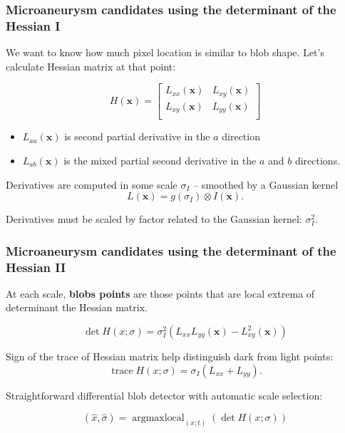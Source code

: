\begin{frame}\frametitle{Microaneurysm candidates using the determinant of the Hessian I}

We want to know how much pixel location is similar to blob shape. Let's calculate Hessian matrix at that point:

\[
H(\mathbf{x}) = 
\begin{bmatrix}
L_{xx}(\mathbf{x}) & L_{xy}(\mathbf{x})\\
L_{xy}(\mathbf{x}) & L_{yy}(\mathbf{x})\\
\end{bmatrix}
\]

\begin{itemize}
\item $L_{aa}(\mathbf{x})$ is second partial derivative in the $a$ direction 
\item $L_{ab}(\mathbf{x})$ is the mixed partial second derivative in the $a$ and $b$ directions.
\end{itemize}

\par Derivatives are computed in some scale $\sigma_I$ -- smoothed by a Gaussian kernel
 \[L(\mathbf{x}) = g(\sigma_I) \otimes I(\mathbf{x}) .\]

\par Derivatives must be scaled by factor related to the Gaussian kernel: $\sigma_I^2$.

\end{frame}

\begin{frame}\frametitle{Microaneurysm candidates using the determinant of the Hessian II}

\par At each scale, \textbf{blobs points} are those points that are local extrema of determinant the Hessian matrix. 

\[ \operatorname{det} H(x; \sigma) = \sigma_I^2 ( L_{xx}L_{yy}(\mathbf{x}) - L_{xy}^2(\mathbf{x})) \]

\par Sign of the trace of Hessian matrix help distinguish dark from light points:
\[ \operatorname{trace} H(x; \sigma) = \sigma_I (L_{xx} + L_{yy}). \]

\par Straightforward differential blob detector with automatic scale selection:

\[ 
	(\hat{x}, \hat{\sigma}) = 
	\operatorname{argmaxlocal}_{(x; t)} ( \operatorname{det} H(x; \sigma) ) 
\]

\end{frame}

